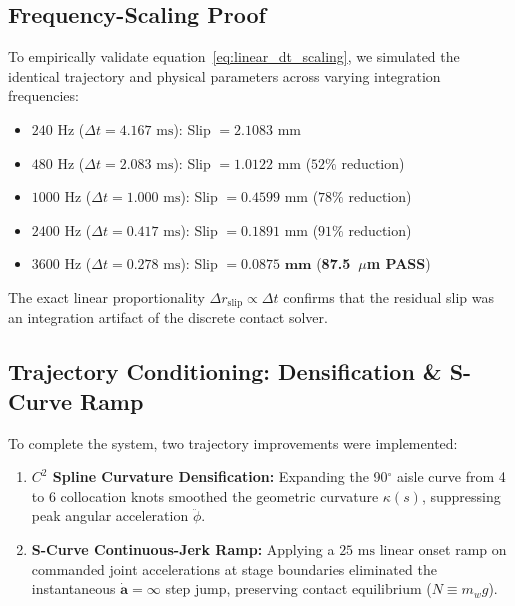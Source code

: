 \documentclass{article}
\begin{document}
\subsection{Frequency-Scaling Proof}
To empirically validate equation~\eqref{eq:linear_dt_scaling}, we simulated the identical trajectory and physical parameters across varying integration frequencies:
\begin{itemize}
    \item $240\text{ Hz}$ ($\Delta t = 4.167\text{ ms}$): Slip $= 2.1083\text{ mm}$
    \item $480\text{ Hz}$ ($\Delta t = 2.083\text{ ms}$): Slip $= 1.0122\text{ mm}$ ($52\%$ reduction)
    \item $1000\text{ Hz}$ ($\Delta t = 1.000\text{ ms}$): Slip $= 0.4599\text{ mm}$ ($78\%$ reduction)
    \item $2400\text{ Hz}$ ($\Delta t = 0.417\text{ ms}$): Slip $= 0.1891\text{ mm}$ ($91\%$ reduction)
    \item $3600\text{ Hz}$ ($\Delta t = 0.278\text{ ms}$): Slip $= \mathbf{0.0875\text{ mm}}$ (\textbf{87.5~$\mu$m PASS})
\end{itemize}
The exact linear proportionality $\Delta r_{\text{slip}} \propto \Delta t$ confirms that the residual slip was an integration artifact of the discrete contact solver. 

\subsection{Trajectory Conditioning: Densification \& S-Curve Ramp}
To complete the system, two trajectory improvements were implemented:
\begin{enumerate}
    \item \textbf{$C^2$ Spline Curvature Densification:} Expanding the 90$^\circ$ aisle curve from 4 to 6 collocation knots smoothed the geometric curvature $\kappa(s)$, suppressing peak angular acceleration $\ddot{\phi}$.
    \item \textbf{S-Curve Continuous-Jerk Ramp:} Applying a $25\text{ ms}$ linear onset ramp on commanded joint accelerations at stage boundaries eliminated the instantaneous $\dot{\mathbf{a}} = \infty$ step jump, preserving contact equilibrium ($N \equiv m_w g$).
\end{enumerate}
\end{document}
